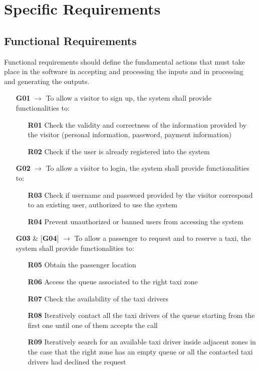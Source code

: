 \chapter{Specific Requirements} \label{chap3}

\section{Functional Requirements}
Functional requirements should define the fundamental actions that must take place in the software in accepting and processing the inputs and in processing and generating the outputs.

\begin{itemize}
	\item [\textbf{G01}] $\rightarrow$ To allow a visitor to sign up, the system shall provide functionalities to:
	\begin{itemize}
		\item [\textbf{R01}] Check the validity and correctness of the information provided by the visitor (personal information, password, payment information)
		\item [\textbf{R02}] Check if the user is already registered into the system 
	\end{itemize}
	
	\item [\textbf{G02}] $\rightarrow$ To allow a visitor to login, the system shall provide functionalities to:
	\begin{itemize}
		\item [\textbf{R03}] Check if username and password provided by the visitor correspond to an existing user, authorized to use the system
		\item [\textbf{R04}] Prevent unauthorized or banned users from accessing the system 
	\end{itemize}
	
	\item [\textbf{G03}] \& [\textbf{G04}] $\rightarrow$ To allow a passenger to request and to reserve a taxi, the system shall provide functionalities to:
	\begin{itemize}
		\item [\textbf{R05}] Obtain the passenger location
		\item [\textbf{R06}] Access the queue associated to the right taxi zone
		\item [\textbf{R07}] Check the availability of the taxi drivers
		\item [\textbf{R08}] Iteratively contact all the taxi drivers of the queue starting from the first one until one of them accepts the call
		\item [\textbf{R09}] Iteratively search for an available taxi driver inside adjacent zones in the case that the right zone has an empty queue or all the contacted taxi drivers had declined the request
	\end{itemize}
	

\end{itemize}
